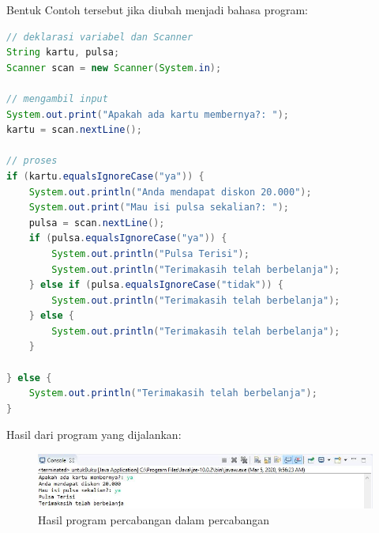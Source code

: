 \noindent{}

\medskip

Bentuk Contoh tersebut jika diubah menjadi bahasa program:
\begin{lstlisting}[language=Java]
// deklarasi variabel dan Scanner
String kartu, pulsa;
Scanner scan = new Scanner(System.in);

// mengambil input
System.out.print("Apakah ada kartu membernya?: ");
kartu = scan.nextLine();

// proses
if (kartu.equalsIgnoreCase("ya")) {
    System.out.println("Anda mendapat diskon 20.000");
    System.out.print("Mau isi pulsa sekalian?: ");
    pulsa = scan.nextLine();
    if (pulsa.equalsIgnoreCase("ya")) {
        System.out.println("Pulsa Terisi");
        System.out.println("Terimakasih telah berbelanja");
    } else if (pulsa.equalsIgnoreCase("tidak")) {
        System.out.println("Terimakasih telah berbelanja");
    } else {
        System.out.println("Terimakasih telah berbelanja");
    }

} else {
    System.out.println("Terimakasih telah berbelanja");
}
\end{lstlisting}

Hasil dari program yang dijalankan:
\begin{figure}[h!]
    \centering
    \includegraphics[scale=0.6]{pictures/hasil_percabangan_dalam_percabangan.JPG}
    \caption{Hasil program percabangan dalam percabangan}
    \label{}
\end{figure}








